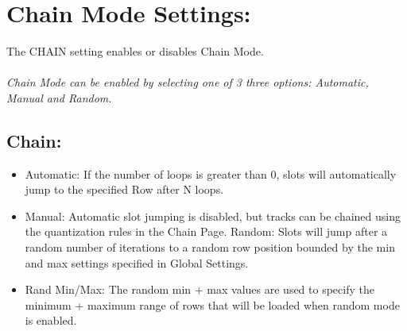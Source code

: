 \chapter{Chain Mode Settings:}
The CHAIN setting enables or disables Chain Mode.\\
\\
\textit{ Chain Mode can be enabled by selecting one of 3 three options: Automatic, Manual and Random.}
\\
\section{Chain:}
\begin{itemize}
\item Automatic: If the number of loops is greater than 0, slots will automatically jump to the specified Row after N loops.
\item Manual: Automatic slot jumping is disabled, but tracks can be chained using the quantization rules in the Chain Page.
Random: Slots will jump after a random number of iterations to a random row position bounded by the min and max settings specified in Global Settings.
\item Rand Min/Max: The random min + max values are used to specify the minimum + maximum range of rows that will be loaded when random mode is enabled.
\end{itemize}
